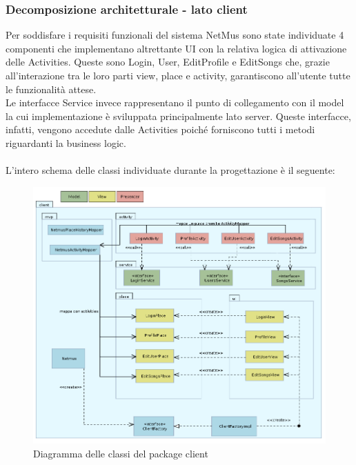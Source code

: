 \newpage
\subsubsection{Decomposizione architetturale - lato client}
Per soddisfare i requisiti funzionali del sistema NetMus sono state individuate
4 componenti che implementano altrettante UI con la relativa logica di
attivazione delle Activities. Queste sono Login, User, EditProfile e EditSongs
che, grazie all'interazione tra le loro parti view, place e activity,
garantiscono all'utente tutte le funzionalit\`a attese.\\
Le interfacce Service invece rappresentano il punto di collegamento con il model
la cui implementazione \`e sviluppata principalmente lato server. Queste
interfacce, infatti, vengono accedute dalle Activities poich\'e forniscono tutti i
metodi riguardanti la business logic. \\\\ 
L'intero schema delle classi individuate durante la progettazione \`e il
seguente: 
\begin{figure}[h]
  \centering
  \includegraphics[width=16.5cm]{img/ST/client.png}
\caption{Diagramma delle classi del package client}
\end{figure}
\newpage
